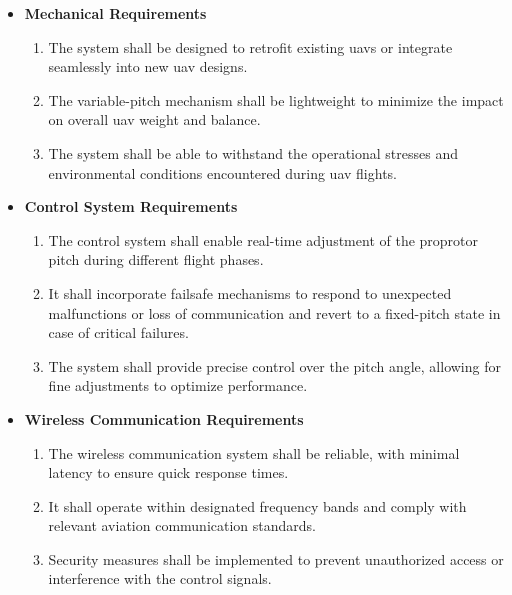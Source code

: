 \begin{itemize}
    \item \textbf{Mechanical Requirements}
          \begin{enumerate}[start=1,label={\upshape\bfseries (REQ\_0\arabic*):},wide = 0pt, leftmargin = 3em]
              \item The system shall be designed to retrofit existing \glspl{uav} or integrate seamlessly into new \gls{uav} designs.
              \item The variable-pitch mechanism shall be lightweight to minimize the impact on overall \gls{uav} weight and balance.
              \item The system shall be able to withstand the operational stresses and environmental conditions encountered during \gls{uav} flights.
          \end{enumerate}

    \item \textbf{Control System Requirements}
          \begin{enumerate}[start=04,label={\bfseries (REQ\_0\arabic*):},wide = 0pt, leftmargin = 3em]
              \item The control system shall enable real-time adjustment of the proprotor pitch during different flight phases.
              \item It shall incorporate failsafe mechanisms to respond to unexpected malfunctions or loss of communication and revert to a fixed-pitch state in case of critical failures.
              \item The system shall provide precise control over the pitch angle, allowing for fine adjustments to optimize performance.
          \end{enumerate}

    \item \textbf{Wireless Communication Requirements}
          \begin{enumerate}[start=07,label={\bfseries (REQ\_0\arabic*):},wide = 0pt, leftmargin = 3em]
              \item The wireless communication system shall be reliable, with minimal latency to ensure quick response times.
              \item It shall operate within designated frequency bands and comply with relevant aviation communication standards.
              \item Security measures shall be implemented to prevent unauthorized access or interference with the control signals.
          \end{enumerate}


\end{itemize}
